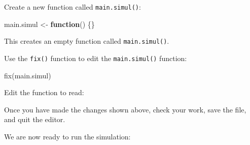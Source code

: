 \documentclass[
  12pt,
  a4paper]{book}
\newenvironment{Shaded}{\begin{snugshade}}{\end{snugshade}}
\newcommand{\AttributeTok}[1]{\textcolor[rgb]{0.77,0.63,0.00}{#1}}
\newcommand{\ConstantTok}[1]{\textcolor[rgb]{0.00,0.00,0.00}{#1}}
\newcommand{\ControlFlowTok}[1]{\textcolor[rgb]{0.13,0.29,0.53}{\textbf{#1}}}
\newcommand{\FunctionTok}[1]{\textcolor[rgb]{0.00,0.00,0.00}{#1}}
\newcommand{\NormalTok}[1]{#1}
\newcommand{\OtherTok}[1]{\textcolor[rgb]{0.56,0.35,0.01}{#1}}
\newcommand{\SpecialCharTok}[1]{\textcolor[rgb]{0.00,0.00,0.00}{#1}}
\newcommand{\StringTok}[1]{\textcolor[rgb]{0.31,0.60,0.02}{#1}}
\begin{document}
Create a new function called \texttt{main.simul()}:

\begin{Shaded}
\begin{Highlighting}[]
\NormalTok{main.simul }\OtherTok{\textless{}{-}} \ControlFlowTok{function}\NormalTok{() \{\}}
\end{Highlighting}
\end{Shaded}

This creates an empty function called \texttt{main.simul()}.

Use the \texttt{fix()} function to edit the \texttt{main.simul()} function:

\begin{Shaded}
\begin{Highlighting}[]
\FunctionTok{fix}\NormalTok{(main.simul)}
\end{Highlighting}
\end{Shaded}

Edit the function to read:

\begin{Shaded}
\end{Shaded}

Once you have made the changes shown above, check your work, save the file, and quit the editor.

We are now ready to run the simulation:
\end{document}
